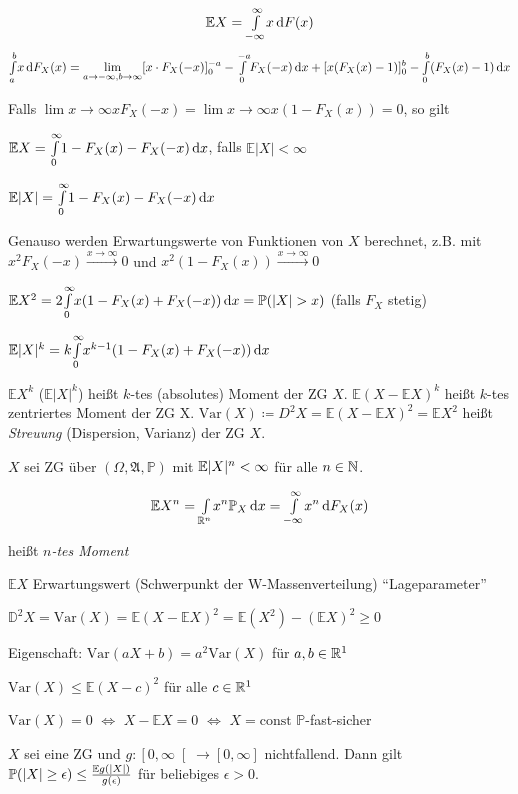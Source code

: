 \documentclass{cheat-sheet}
\newcommand{\Alg}{\mathfrak{A}} %
\renewcommand{\P}{\mathbb{P}}
\newcommand{\E}{\mathbb{E}} %
\newcommand{\Var}{\mathrm{Var}} %
\begin{document}
\[ \E X = \Int{- \infty}{\infty}{x}{F(x)} \]
\[ {\textstyle \int\limits_{a}^{b}} x \,\mathrm{d} F_X(x) = \lim_{a \to -\infty, b \to \infty} [x \cdot F_X(-x)]_0^{-a} - {\textstyle \int\limits_{0}^{-a}} F_X(-x) \,\mathrm{d} x + [x (F_X(x) - 1)]_0^b - {\textstyle \int\limits_{0}^{b}} (F_X(x) - 1) \,\mathrm{d} x \]

Falls $\lim{x \to \infty} x F_X(-x) = \lim{x \to \infty} x (1 - F_X(x)) = 0$, so gilt

$\E X = \Int{0}{\infty}{1 - F_X(x) - F_X(-x)}{x}$, falls $\E |X| < \infty$

$\E |X| = \Int{0}{\infty}{1 - F_X(x) - F_X(-x)}{x}$

Genauso werden Erwartungswerte von Funktionen von $X$ berechnet, z.B. mit $x^2 F_X(-x) \xrightarrow{x \to \infty} 0$ und $x^2 (1 - F_X(x)) \xrightarrow{x \to \infty} 0$

$\E X^2 = 2 \Int{0}{\infty}{x (1 - F_X(x) + F_X(-x))}{x} = \P(|X| > x)$ (falls $F_X$ stetig)

$\E |X|^k = k \Int{0}{\infty}{x^{k-1} (1 - F_X(x) + F_X(-x))}{x}$

\begin{defn}
  $\E X^k$ ($\E |X|^k$) heißt $k$-tes (absolutes) Moment der ZG $X$. $\E (X - \E X)^k$ heißt $k$-tes zentriertes Moment der ZG X. $\mathrm{Var}(X) \coloneqq D^2 X = \E (X - \E X)^2 = \E X^2$ heißt \emph{Streuung} (Dispersion, Varianz) der ZG $X$.
\end{defn}





$X$ sei ZG über $(\Omega, \Alg, \P)$ mit $\E \abs{X}^n < \infty$ für alle $n \in \mathbb{N}$.

\[ \E X^n = \Int{\R^n}{}{x^n \P_X}{x} = \Int{-\infty}{\infty}{x^n}{F_X(x)} \]

heißt \emph{$n$-tes Moment}

$\E X$ Erwartungswert (Schwerpunkt der W-Massenverteilung) "`Lageparameter"'

$\mathbb{D}^2 X = \Var(X) = \E(X-\E X)^2 = \E(X^2) - (\E X)^2 \geq 0$

Eigenschaft: $\Var(aX+b) = a^2 \Var(X)$ für $a, b \in \mathbb{R}^1$

$\Var(X) \leq \E (X-c)^2$ für alle $c \in \mathbb{R}^1$

$\Var(X) = 0$ $\iff$ $X - \E X = 0$ $\iff$ $X = \mathrm{const}$ $\P$-fast-sicher

\begin{satz}
  $X$ sei eine ZG und $g : \left[ 0, \infty \right[ \to [0,\infty]$ nichtfallend. Dann gilt $\P(\abs{X} \geq \epsilon) \leq \frac{\E g(\abs{X})}{g(\epsilon)}$ für beliebiges $\epsilon > 0$.
\end{satz}
\end{document}
